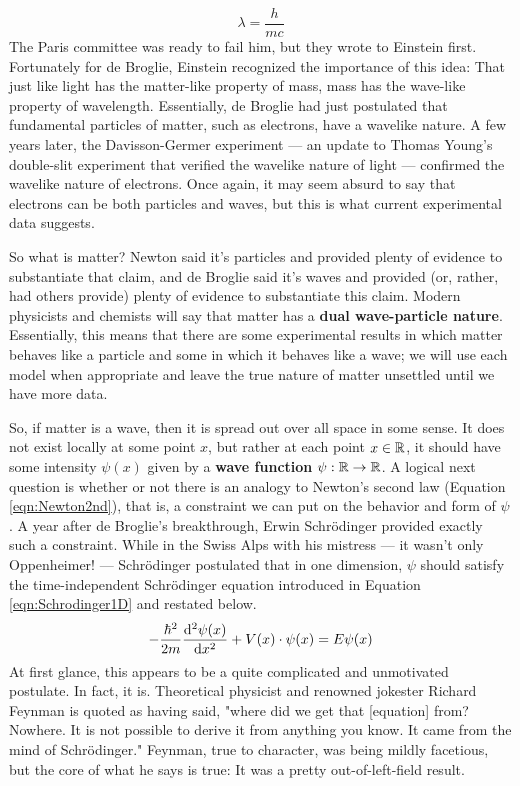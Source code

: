 \documentclass[titlepage]{article}
\numberwithin{equation}{section}
\begin{document}
\begin{equation*}
    \lambda = \frac{h}{mc}
\end{equation*}
The Paris committee was ready to fail him, but they wrote to Einstein first. Fortunately for de Broglie, Einstein recognized the importance of this idea: That just like light has the matter-like property of mass, mass has the wave-like property of wavelength. Essentially, de Broglie had just postulated that fundamental particles of matter, such as electrons, have a wavelike nature. A few years later, the Davisson-Germer experiment --- an update to Thomas Young's double-slit experiment that verified the wavelike nature of light --- confirmed the wavelike nature of electrons. Once again, it may seem absurd to say that electrons can be both particles and waves, but this is what current experimental data suggests.\par
So what is matter? Newton said it's particles and provided plenty of evidence to substantiate that claim, and de Broglie said it's waves and provided (or, rather, had others provide) plenty of evidence to substantiate this claim. Modern physicists and chemists will say that matter has a \textbf{dual wave-particle nature}. Essentially, this means that there are some experimental results in which matter behaves like a particle and some in which it behaves like a wave; we will use each model when appropriate and leave the true nature of matter unsettled until we have more data.\par
So, if matter is a wave, then it is spread out over all space in some sense. It does not exist locally at some point $x$, but rather at each point $x\in\mathbb{R}$, it should have some intensity $\psi(x)$ given by a \textbf{wave function} $\psi:\mathbb{R}\to\mathbb{R}$. A logical next question is whether or not there is an analogy to Newton's second law (Equation \ref{eqn:Newton2nd}), that is, a constraint we can put on the behavior and form of $\psi$. A year after de Broglie's breakthrough, Erwin Schr\"{o}dinger provided exactly such a constraint. While in the Swiss Alps with his mistress --- it wasn't only Oppenheimer! --- Schr\"{o}dinger postulated that in one dimension, $\psi$ should satisfy the time-independent Schr\"{o}dinger equation introduced in Equation \ref{eqn:Schrodinger1D} and restated below.
\begin{equation*}
    -\frac{\hbar^2}{2m}\dv[2]{\psi(x)}{x}+V(x)\cdot\psi(x) = E\psi(x)
\end{equation*}
At first glance, this appears to be a quite complicated and unmotivated postulate. In fact, it is. Theoretical physicist and renowned jokester Richard Feynman is quoted as having said, "where did we get that [equation] from? Nowhere. It is not possible to derive it from anything you know. It came from the mind of Schr\"{o}dinger." Feynman, true to character, was being mildly facetious, but the core of what he says is true: It was a pretty out-of-left-field result.\par
\end{document}
